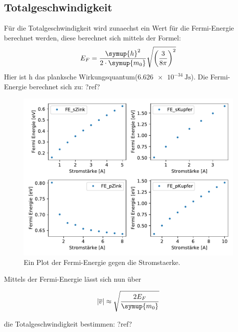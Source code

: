     \subsection{Totalgeschwindigkeit}


    Für die Totalgeschwindigkeit wird zunaechst ein Wert für die Fermi-Energie berechnet werden, diese berechnet sich mittels der Formel:
    \begin{equation}
        E_F = \frac{\symup{h}^2}{2 \cdot \symup{m_0}}\sqrt{\left(\frac{3}{8\pi}\right)^2}
    \end{equation}
    Hier ist h das planksche Wirkungsquantum($\SI{6.626e-34}{\joule\second}$).
    Die Fermi-Energie berechnet sich zu: ?ref?

    \begin{figure}[H]
        \centering
        \includegraphics[width=1.1\textwidth]{build/Fermi.pdf}
        \caption{Ein Plot der Fermi-Energie gegen die Stromstaerke.}
        \label{img:FE}
    \end{figure}

    Mittels der Fermi-Energie lässt sich nun über 

    \begin{equation}
        |\overline{v}| \approx \sqrt{\frac{2E_F}{\symup{m_0}}} \nonumber
    \end{equation}

    die Totalgeschwindigkeit bestimmen: ?ref?

